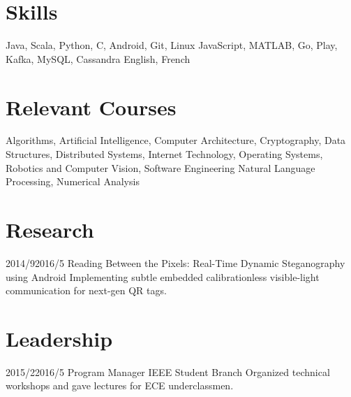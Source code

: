 \documentclass[11pt,letterpaper]{moderncv}
\begin{document}
\section{Skills}
       {Java, Scala, Python, C, Android, Git, Linux}
       {JavaScript, MATLAB, Go, Play, Kafka, MySQL, Cassandra}
       {English, French}

\section{Relevant Courses}
       {Algorithms, Artificial Intelligence, Computer Architecture, Cryptography, Data Structures, Distributed Systems, Internet Technology, Operating Systems, Robotics and Computer Vision, Software Engineering}
       {Natural Language Processing, Numerical Analysis}

\section{Research}
    \tlcventry
        {2014/9}{2016/5}
		{Reading Between the Pixels: Real-Time Dynamic Steganography using Android}
        {}
        {}
        {}
        {Implementing subtle embedded calibrationless visible-light communication for next-gen QR tags.}


\section{Leadership}
	\tlcventry
        {2015/2}{2016/5}
        {Program Manager}
        {}
        {IEEE Student Branch}
        {}
        {Organized technical workshops and gave lectures for ECE underclassmen.}
\end{document}
